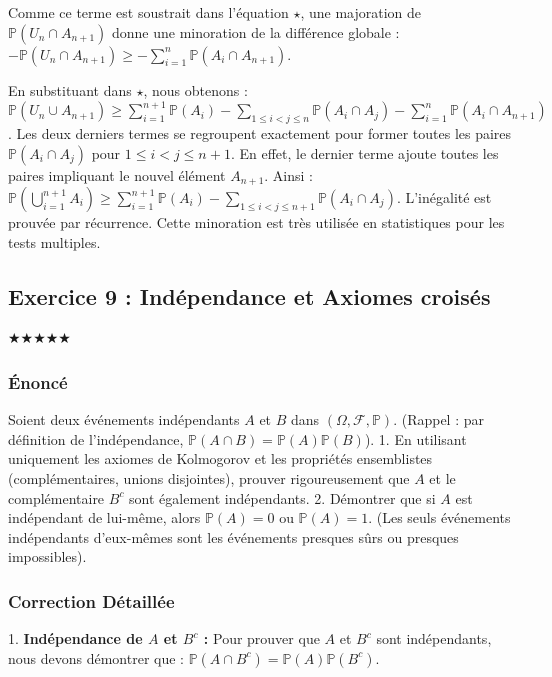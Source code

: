 \documentclass[11pt,a4paper]{article}
\begin{document}
Comme ce terme est soustrait dans l'équation $\star$, une majoration de $\mathbb{P}(U_n \cap A_{n+1})$ donne une minoration de la différence globale :
$- \mathbb{P}(U_n \cap A_{n+1}) \ge - \sum_{i=1}^n \mathbb{P}(A_i \cap A_{n+1})$.

En substituant dans $\star$, nous obtenons :
$\mathbb{P}(U_n \cup A_{n+1}) \ge \sum_{i=1}^{n+1} \mathbb{P}(A_i) - \sum_{1 \le i < j \le n} \mathbb{P}(A_i \cap A_j) - \sum_{i=1}^n \mathbb{P}(A_i \cap A_{n+1})$.
Les deux derniers termes se regroupent exactement pour former toutes les paires $\mathbb{P}(A_i \cap A_j)$ pour $1 \le i < j \le n+1$. En effet, le dernier terme ajoute toutes les paires impliquant le nouvel élément $A_{n+1}$.
Ainsi :
$\mathbb{P}\left(\bigcup_{i=1}^{n+1} A_i\right) \ge \sum_{i=1}^{n+1} \mathbb{P}(A_i) - \sum_{1 \le i < j \le n+1} \mathbb{P}(A_i \cap A_j)$.
L'inégalité est prouvée par récurrence. Cette minoration est très utilisée en statistiques pour les tests multiples.



\subsection*{Exercice 9 : Indépendance et Axiomes croisés}
$\bigstar\bigstar\bigstar\bigstar\bigstar$

\subsubsection*{Énoncé}

Soient deux événements indépendants $A$ et $B$ dans $(\Omega, \mathcal{F}, \mathbb{P})$. (Rappel : par définition de l'indépendance, $\mathbb{P}(A \cap B) = \mathbb{P}(A)\mathbb{P}(B)$).
1. En utilisant uniquement les axiomes de Kolmogorov et les propriétés ensemblistes (complémentaires, unions disjointes), prouver rigoureusement que $A$ et le complémentaire $B^c$ sont également indépendants.
2. Démontrer que si $A$ est indépendant de lui-même, alors $\mathbb{P}(A) = 0$ ou $\mathbb{P}(A) = 1$. (Les seuls événements indépendants d'eux-mêmes sont les événements presques sûrs ou presques impossibles).


\subsubsection*{Correction Détaillée}

1. \textbf{Indépendance de $A$ et $B^c$ :}
Pour prouver que $A$ et $B^c$ sont indépendants, nous devons démontrer que :
$\mathbb{P}(A \cap B^c) = \mathbb{P}(A)\mathbb{P}(B^c)$.
\end{document}
